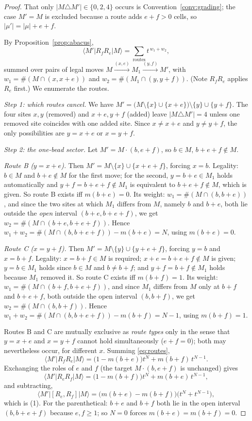 \documentclass[11pt]{article}
\theoremstyle{definition}
\begin{document}
\begin{proof}
That only $|M\triangle M'|\in\{0,2,4\}$ occurs is Convention~\ref{conv:grading}; the case
$M'=M$ is excluded because a route adds $e+f>0$ cells, so $|\mu'|=|\mu|+e+f$.

By Proposition~\ref{prop:abacus},
\begin{equation}\label{eq:routes}
 \langle M'|R_fR_e|M\rangle=\sum_{\text{routes}} t^{\,w_1+w_2},
\end{equation}
summed over pairs of legal moves $M\xrightarrow{(x,e)}M_1\xrightarrow{(y,f)}M'$, with
$w_1=\#(M\cap(x,x+e))$ and $w_2=\#(M_1\cap(y,y+f))$.  (Note $R_fR_e$ applies $R_e$ first.)
We enumerate the routes.

\smallskip
\emph{Step 1: which routes cancel.}  We have
$M'=\bigl(M\setminus\{x\}\cup\{x+e\}\bigr)\setminus\{y\}\cup\{y+f\}$.  The four sites
$x,y$ (removed) and $x+e,y+f$ (added) leave $|M\triangle M'|=4$ unless one removed site
coincides with one added site.  Since $x\ne x+e$ and $y\ne y+f$, the only possibilities
are $y=x+e$ or $x=y+f$.

\smallskip
\emph{Step 2: the one-bead sector.}  Let $M'=M\cdot(b,e+f)$, so $b\in M$,
$b+e+f\notin M$.

\emph{Route B ($y=x+e$).}  Then $M'=M\setminus\{x\}\cup\{x+e+f\}$, forcing $x=b$.
Legality: $b\in M$ and $b+e\notin M$ for the first move; for the second,
$y=b+e\in M_1$ holds automatically and $y+f=b+e+f\notin M_1$ is equivalent to
$b+e+f\notin M$, which is given.  So route B exists iff $m(b+e)=0$.  Its weight:
$w_1=\#(M\cap(b,b+e))$, and since the two sites at which $M_1$ differs from $M$, namely
$b$ and $b+e$, both lie outside the \emph{open} interval $(b+e,b+e+f)$, we get
$w_2=\#(M\cap(b+e,b+e+f))$.  Hence
$w_1+w_2=\#(M\cap(b,b+e+f))-m(b+e)=N$, using $m(b+e)=0$.

\emph{Route C ($x=y+f$).}  Then $M'=M\setminus\{y\}\cup\{y+e+f\}$, forcing $y=b$ and
$x=b+f$.  Legality: $x=b+f\in M$ is required; $x+e=b+e+f\notin M$ is given;
$y=b\in M_1$ holds since $b\in M$ and $b\ne b+f$; and $y+f=b+f\notin M_1$ holds because
$M_1$ removed it.  So route C exists iff $m(b+f)=1$.  Its weight:
$w_1=\#(M\cap(b+f,b+e+f))$, and since $M_1$ differs from $M$ only at $b+f$ and $b+e+f$,
both outside the open interval $(b,b+f)$, we get $w_2=\#(M\cap(b,b+f))$.  Hence
$w_1+w_2=\#(M\cap(b,b+e+f))-m(b+f)=N-1$, using $m(b+f)=1$.

Routes B and C are mutually exclusive as \emph{route types} only in the sense that
$y=x+e$ and $x=y+f$ cannot hold simultaneously ($e+f=0$); both may nevertheless occur, for
different $x$.  Summing \eqref{eq:routes},
\[
  \langle M'|R_fR_e|M\rangle=\bigl(1-m(b+e)\bigr)t^{N}+m(b+f)\,t^{N-1}.
\]
Exchanging the roles of $e$ and $f$ (the target $M\cdot(b,e+f)$ is unchanged) gives
\[
  \langle M'|R_eR_f|M\rangle=\bigl(1-m(b+f)\bigr)t^{N}+m(b+e)\,t^{N-1},
\]
and subtracting,
\[
  \langle M'|[R_e,R_f]|M\rangle=\bigl(m(b+e)-m(b+f)\bigr)\bigl(t^{N}+t^{N-1}\bigr),
\]
which is (1).  For the parenthetical: $b+e$ and $b+f$ both lie in the open interval
$(b,b+e+f)$ because $e,f\ge1$; so $N=0$ forces $m(b+e)=m(b+f)=0$.


\end{proof}
\end{document}
